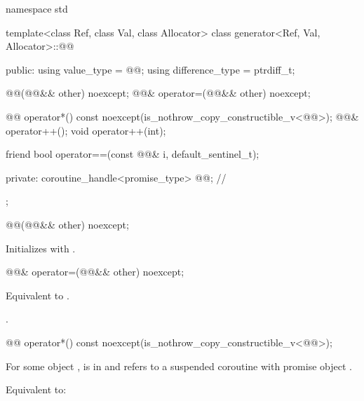 \begin{codeblock}
namespace std {
  template<class Ref, class Val, class Allocator>
  class generator<Ref, Val, Allocator>::@@ {
  public:
    using value_type = @@;
    using difference_type = ptrdiff_t;

    @@(@@&& other) noexcept;
    @@& operator=(@@&& other) noexcept;

    @@ operator*() const noexcept(is_nothrow_copy_constructible_v<@@>);
    @@& operator++();
    void operator++(int);

    friend bool operator==(const @@& i, default_sentinel_t);

  private:
    coroutine_handle<promise_type> @@; // \expos
  };
}
\end{codeblock}

%
\begin{itemdecl}
@@(@@&& other) noexcept;
\end{itemdecl}

\begin{itemdescr}
\pnum
\effects
Initializes 
with .
\end{itemdescr}

%
\begin{itemdecl}
@@& operator=(@@&& other) noexcept;
\end{itemdecl}

\begin{itemdescr}
\pnum
\effects
Equivalent to
.

\pnum
\returns
{}.
\end{itemdescr}

%
\begin{itemdecl}
@@ operator*() const noexcept(is_nothrow_copy_constructible_v<@@>);
\end{itemdecl}

\begin{itemdescr}
\pnum
\expects
For some  object ,
 is in  and
 refers to
a suspended coroutine with promise object .

\pnum
\effects
Equivalent to:
\end{itemdescr}

